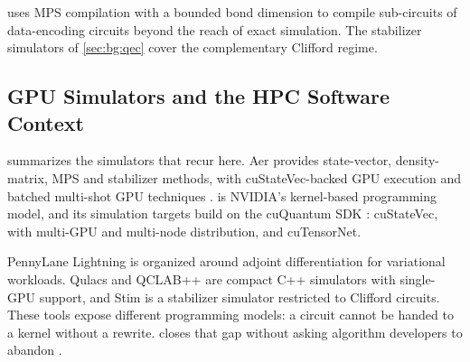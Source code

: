  uses MPS compilation with a bounded bond dimension to compile sub-circuits of data-encoding circuits beyond the reach of exact simulation. The stabilizer simulators of \cref{sec:bg:qec} cover the complementary Clifford regime.

\subsection{GPU Simulators and the HPC Software Context}

 summarizes the simulators that recur here. \qiskit{} Aer \cite{javadiabhari2024qiskit} provides state-vector, density-matrix, MPS and stabilizer methods, with cuStateVec-backed GPU execution and batched multi-shot GPU techniques \cite{doi2023multishotgpu}. \cudaq{} \cite{kim2023cudaquantum} is NVIDIA's kernel-based programming model, and its simulation targets build on the cuQuantum SDK \cite{bayraktar2023cuquantum}: cuStateVec, with multi-GPU and multi-node distribution, and cuTensorNet.

PennyLane Lightning \cite{asadi2024pennylanelightning} is organized around adjoint differentiation for variational workloads. Qulacs \cite{suzuki2021qulacs} and QCLAB++ \cite{vanbeeumen2023qclabpp} are compact C++ simulators with single-GPU support, and Stim \cite{gidney2021stim} is a stabilizer simulator restricted to Clifford circuits. These tools expose different programming models: a \qiskit{} circuit cannot be handed to a \cudaq{} kernel without a rewrite.  closes that gap without asking algorithm developers to abandon \qiskit{}.

